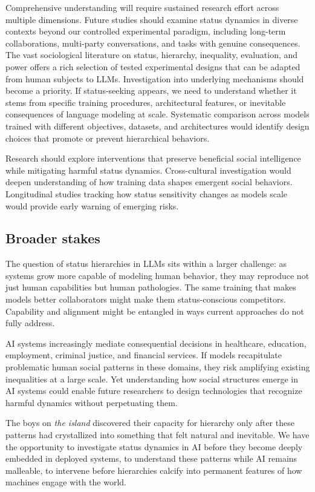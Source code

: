 Comprehensive understanding will require sustained research effort across multiple dimensions. Future studies should examine status dynamics in diverse contexts beyond our controlled experimental paradigm, including long-term collaborations, multi-party conversations, and tasks with genuine consequences. The vast sociological literature on status, hierarchy, inequality, evaluation, and power offers a rich selection of tested experimental designs that can be adapted from human subjects to LLMs. Investigation into underlying mechanisms should become a priority. If status-seeking appears, we need to understand whether it stems from specific training procedures, architectural features, or inevitable consequences of language modeling at scale. Systematic comparison across models trained with different objectives, datasets, and architectures would identify design choices that promote or prevent hierarchical behaviors.

Research should explore interventions that preserve beneficial social intelligence while mitigating harmful status dynamics. Cross-cultural investigation would deepen understanding of how training data shapes emergent social behaviors. Longitudinal studies tracking how status sensitivity changes as models scale would provide early warning of emerging risks.

\subsection*{Broader stakes}

The question of status hierarchies in LLMs sits within a larger challenge: as systems grow more capable of modeling human behavior, they may reproduce not just human capabilities but human pathologies. The same training that makes models better collaborators might make them status-conscious competitors. Capability and alignment might be entangled in ways current approaches do not fully address.

AI systems increasingly mediate consequential decisions in healthcare, education, employment, criminal justice, and financial services. If models recapitulate problematic human social patterns in these domains, they risk amplifying existing inequalities at a large scale. Yet understanding how social structures emerge in AI systems could enable future researchers to design technologies that recognize harmful dynamics without perpetuating them.

The boys on \textit{the island} discovered their capacity for hierarchy only after these patterns had crystallized into something that felt natural and inevitable. We have the opportunity to investigate status dynamics in AI before they become deeply embedded in deployed systems, to understand these patterns while AI remains malleable, to intervene before hierarchies calcify into permanent features of how machines engage with the world.

